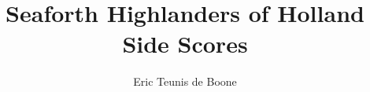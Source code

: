 \documentclass{tex/score_book}
\title{Seaforth Highlanders of Holland\\Side Scores}
\author{Eric Teunis de Boone}
\begin{document}


\newpage
\cleardoublepage
{}
{}
\begin{multicols}{2}
  \tableofcontents
\end{multicols}

%
\newpage

\end{document}
